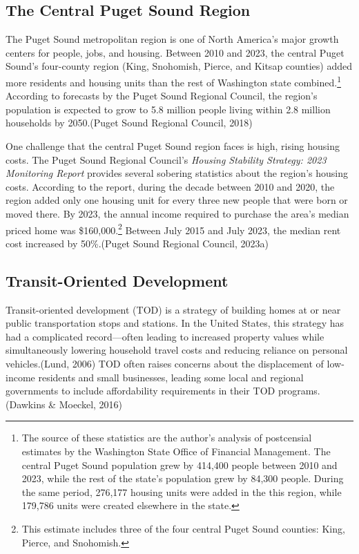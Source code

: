 \documentclass[
]{agujournal2019}
\begin{document}
\subsection{The Central Puget Sound
Region}\label{the-central-puget-sound-region}

The Puget Sound metropolitan region is one of North America's major
growth centers for people, jobs, and housing. Between 2010 and 2023, the
central Puget Sound's four-county region (King, Snohomish, Pierce, and
Kitsap counties) added more residents and housing units than the rest of
Washington state combined.\footnote{The source of these statistics are
  the author's analysis of postcensial estimates by the Washington State
  Office of Financial Management. The central Puget Sound population
  grew by 414,400 people between 2010 and 2023, while the rest of the
  state's population grew by 84,300 people. During the same period,
  276,177 housing units were added in the this region, while 179,786
  units were created elsewhere in the state.} According to forecasts by
the Puget Sound Regional Council, the region's population is expected to
grow to 5.8 million people living within 2.8 million households by
2050.(Puget Sound Regional Council, 2018)

One challenge that the central Puget Sound region faces is high, rising
housing costs. The Puget Sound Regional Council's \emph{Housing
Stability Strategy: 2023 Monitoring Report} provides several sobering
statistics about the region's housing costs. According to the report,
during the decade between 2010 and 2020, the region added only one
housing unit for every three new people that were born or moved there.
By 2023, the annual income required to purchase the area's median priced
home was \$160,000.\footnote{This estimate includes three of the four
  central Puget Sound counties: King, Pierce, and Snohomish.} Between
July 2015 and July 2023, the median rent cost increased by 50\%.(Puget
Sound Regional Council, 2023a)

\subsection{Transit-Oriented
Development}\label{transit-oriented-development}

Transit-oriented development (TOD) is a strategy of building homes at or
near public transportation stops and stations. In the United States,
this strategy has had a complicated record---often leading to increased
property values while simultaneously lowering household travel costs and
reducing reliance on personal vehicles.(Lund, 2006) TOD often raises
concerns about the displacement of low-income residents and small
businesses, leading some local and regional governments to include
affordability requirements in their TOD programs.(Dawkins \& Moeckel,
2016)
\end{document}
